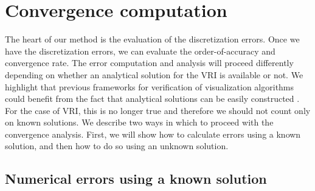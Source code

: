 

\section{Convergence computation}
\label{sec:convergence_analysis}

The heart of our method is the evaluation of the discretization
errors. Once we have the discretization errors, we can evaluate the
order-of-accuracy and convergence rate.  The error computation and
analysis will proceed differently depending on whether an analytical
solution for the VRI is available or not. We highlight that previous
frameworks for verification of visualization algorithms could benefit
from the fact that analytical solutions can be easily constructed
\cite{etiene:tvcg:2009}. For the case of VRI, this is no longer true and
therefore we should not count only on known solutions.  We describe
two ways in which to proceed with the convergence analysis. First, we
will show how to calculate errors using a known solution, and then how
to do so using an unknown solution.

\subsection{Numerical errors using a known solution}

